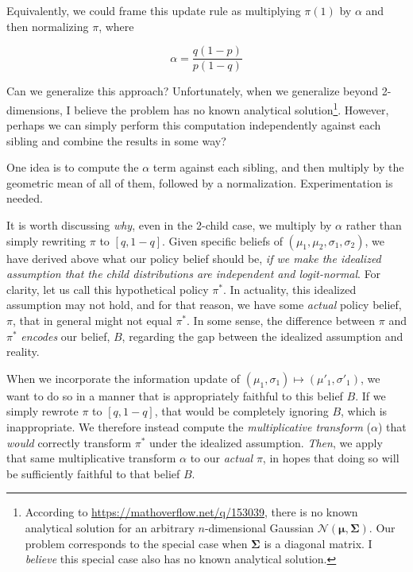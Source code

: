 \documentclass[tikz]{article}
\begin{document}
Equivalently, we could frame this update rule as multiplying $\pi(1)$ by $\alpha$ and then normalizing $\pi$, where

$$
\alpha = \frac{q(1-p)}{p(1-q)}
$$

Can we generalize this approach? Unfortunately, when we generalize beyond 2-dimensions, I believe the problem has no known
analytical solution\footnote{According to \url{https://mathoverflow.net/q/153039}, there is no known analytical solution for an arbitrary $n$-dimensional
Gaussian $\mathcal{N}(\boldsymbol{\mu},\boldsymbol{\Sigma})$. Our problem corresponds to the special case when $\boldsymbol{\Sigma}$ is a diagonal matrix. I \emph{believe}
this special case also has no known analytical solution.}. However, perhaps we can simply perform this computation
independently against each sibling and combine the results in some way? \newline

One idea is to compute the $\alpha$ term against each sibling, and then multiply by the geometric mean of all of them, followed by a normalization.
Experimentation is needed. \newline

It is worth discussing \emph{why}, even in the 2-child case, we multiply by $\alpha$ rather than simply rewriting $\pi$ to $[q, 1-q]$.
Given specific beliefs of $(\mu_1, \mu_2, \sigma_1, \sigma_2)$, we have derived above what our policy belief should be, \textit{if we make
the idealized assumption that the child distributions are independent and logit-normal}. For clarity, let us call this hypothetical policy $\pi^*$.
In actuality, this idealized assumption may not hold, and for that reason, we have some \textit{actual} policy belief, $\pi$, that in general might not
equal $\pi^*$. In some sense, the difference between $\pi$ and $\pi^*$ \emph{encodes} our belief, $B$, regarding the gap between
the idealized assumption and reality. \newline

When we incorporate the information update of $(\mu_1, \sigma_1) \mapsto (\mu'_1, \sigma'_1)$, we want to do so in
a manner that is appropriately faithful to this belief $B$. If we simply rewrote $\pi$ to $[q, 1-q]$, that would be completely
ignoring $B$, which is inappropriate. We therefore instead compute the \textit{multiplicative transform} ($\alpha$)
that \textit{would} correctly transform $\pi^*$ under the idealized assumption. \textit{Then}, we apply that same
multiplicative transform $\alpha$ to our \textit{actual} $\pi$, in hopes that doing so will be sufficiently faithful to that
belief $B$.
\end{document}
